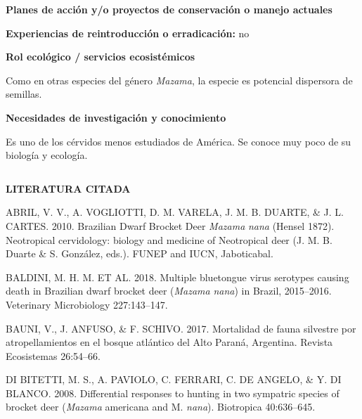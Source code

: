 \documentclass[
  x11names]{article}
\begin{document}
\textbf{Planes de acción y/o proyectos de conservación o manejo
actuales}

\textbf{Experiencias de reintroducción o erradicación:} no

\textbf{Rol ecológico / servicios ecosistémicos}

Como en otras especies del género \textit{Mazama}, la especie es
potencial dispersora de semillas.

\textbf{Necesidades de investigación y conocimiento}

Es uno de los cérvidos menos estudiados de América. Se conoce muy poco
de su biología y ecología.


%
\begin{table}[H]
\centering
\begin{tabular}[t]{>{\raggedright\arraybackslash}m{16cm}>{}m{16cm}}
\toprule
\cellcolor{ceil}{\textcolor{white}{\textbf{\rule{0pt}{14pt}BIBLIOGRAFÍA}}}\\
\bottomrule
\end{tabular}
\end{table}

\vspace{-0.4cm}

\setlength{\parindent}{20pt}\noindent\textbf{LITERATURA CITADA}

ABRIL, V. V., A. VOGLIOTTI, D. M. VARELA, J. M. B. DUARTE, \& J. L.
CARTES. 2010. Brazilian Dwarf Brocket Deer \textit{Mazama} \textit{nana}
(Hensel 1872). Neotropical cervidology: biology and medicine of
Neotropical deer (J. M. B. Duarte \& S. González, eds.). FUNEP and IUCN,
Jaboticabal.

BALDINI, M. H. M. ET AL. 2018. Multiple bluetongue virus serotypes
causing death in Brazilian dwarf brocket deer (\textit{Mazama}
\textit{nana}) in Brazil, 2015--2016. Veterinary Microbiology
227:143--147.

BAUNI, V., J. ANFUSO, \& F. SCHIVO. 2017. Mortalidad de fauna silvestre
por atropellamientos en el bosque atlántico del Alto Paraná, Argentina.
Revista Ecosistemas 26:54--66.

DI BITETTI, M. S., A. PAVIOLO, C. FERRARI, C. DE ANGELO, \& Y. DI
BLANCO. 2008. Differential responses to hunting in two sympatric species
of brocket deer (\textit{Mazama} americana and M. \textit{nana}).
Biotropica 40:636--645.
\end{document}
